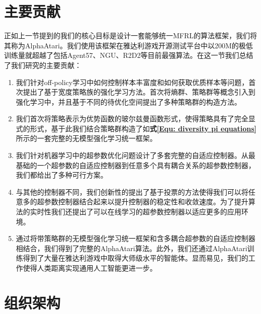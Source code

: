 \section{主要贡献}
正如上一节提到的我们的核心目标是设计一套能够统一MFRL的算法框架，我们将其称为AlphaAtari。我们使用该框架在雅达利游戏开源测试平台中以200M的极低训练量就超越了包括Agent57、NGU、R2D2等目前最强算法。在这一节我们总结了我们研究的主要贡献：
\begin{enumerate}
    \item 我们针对off-policy学习中如何控制样本丰富度和如何获取优质样本等问题，首次提出了基于宽度策略族的强化学习方法。首次将熵群、策略群等概念引入到强化学习中，并且基于不同的待优化空间提出了多种策略群的构造方法。
    \item 我们首次将策略表示为优势函数的玻尔兹曼函数形式，使得策略具有了完全显式的形式，基于此我们结合策略群构造了如\textbf{式\eqref{Equ: diversity pi equations}}所示的一套完整的无模型强化学习统一框架。
    \item 我们针对机器学习中的超参数优化问题设计了多套完整的自适应控制器。从最基础的一个超参数的自适应控制器到任意多个具有耦合关系的超参数控制器，我们都给出了多种可行方案。
    \item 与其他的控制器不同，我们创新性的提出了基于投票的方法使得我们可以将任意多的超参数控制器结合起来以提升控制器的稳定性和收敛速度。为了提升算法的实时性我们还提出了可以在线学习的超参数控制器以适应更多的应用环境。
    \item 通过将带策略群的无模型强化学习统一框架和含多耦合超参数的自适应控制器相结合，我们得到了完整的AlphaAtari算法。此外，我们还通过AlphaAtari训练得到了大量在雅达利游戏中取得大师级水平的智能体。显而易见，我们的工作使得人类距离实现通用人工智能更进一步。
\end{enumerate}
\section{组织架构}

